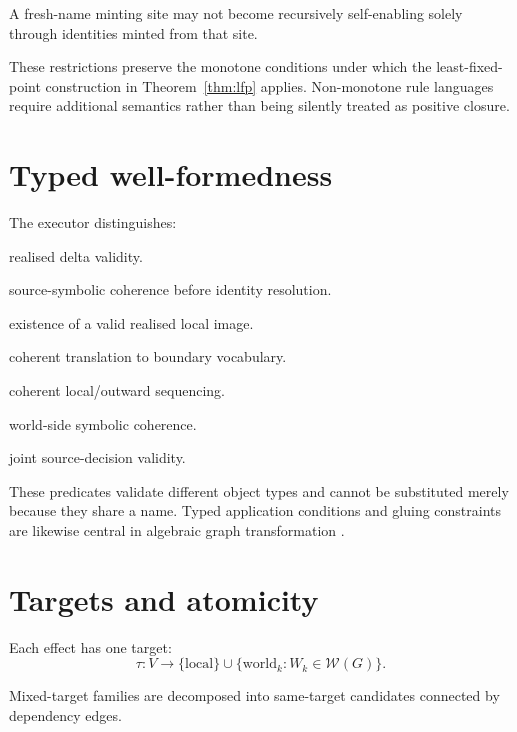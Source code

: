 \documentclass[11pt,a4paper]{article}
\theoremstyle{remark}
\begin{document}
A fresh-name minting site may not become recursively self-enabling solely through identities minted from that site.

These restrictions preserve the monotone conditions under which the least-fixed-point construction in Theorem~\ref{thm:lfp} applies. Non-monotone rule languages require additional semantics rather than being silently treated as positive closure.

\section{Typed well-formedness}\label{sec:wf}

The executor distinguishes:

\begin{description}[leftmargin=*,style=nextline]
\item[$\operatorname{WF}(g,\Delta)$] realised delta validity.
\item[$\operatorname{WF}_{\mathrm{sym}}(g,S)$] source-symbolic coherence before identity resolution.
\item[$\operatorname{WF}_{\mathrm{app}}(g,S)$] existence of a valid realised local image.
\item[$\operatorname{WF}_{\mathrm{rel}}(S)$] coherent translation to boundary vocabulary.
\item[$\operatorname{WF}_{\mathrm{seq}}(S^L,S^A)$] coherent local/outward sequencing.
\item[$\operatorname{WF}^W_{\mathrm{sym}}(W,S)$] world-side symbolic coherence.
\item[$\operatorname{WF}_{\mathrm{decision}}(g,S)$] joint source-decision validity.
\end{description}

These predicates validate different object types and cannot be substituted merely because they share a name. Typed application conditions and gluing constraints are likewise central in algebraic graph transformation \citep{corradini1997,ehrig2006}.

\section{Targets and atomicity}\label{sec:atomicity}

Each effect has one target:
\[
\tau:V\rightarrow
\{\mathrm{local}\}
\cup
\{\mathrm{world}_k:W_k\in\mathcal W(G)\}.
\]

Mixed-target families are decomposed into same-target candidates connected by dependency edges.
\end{document}
